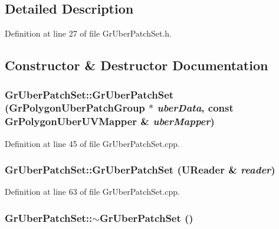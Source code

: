 \subsection{Detailed Description}


Definition at line 27 of file GrUberPatchSet.h.

\subsection{Constructor \& Destructor Documentation}
\hypertarget{class_gr_uber_patch_set_68d0f34222103250196fac2f52b8f4d6}{
\subsubsection[{GrUberPatchSet}]{\setlength{\rightskip}{0pt plus 5cm}GrUberPatchSet::GrUberPatchSet ({\bf GrPolygonUberPatchGroup} $\ast$ {\em uberData}, \/  const {\bf GrPolygonUberUVMapper} \& {\em uberMapper})}}
\label{class_gr_uber_patch_set_68d0f34222103250196fac2f52b8f4d6}




Definition at line 45 of file GrUberPatchSet.cpp.\hypertarget{class_gr_uber_patch_set_de170763792a014a4ec60906e5a559cc}{
\subsubsection[{GrUberPatchSet}]{\setlength{\rightskip}{0pt plus 5cm}GrUberPatchSet::GrUberPatchSet ({\bf UReader} \& {\em reader})}}
\label{class_gr_uber_patch_set_de170763792a014a4ec60906e5a559cc}




Definition at line 63 of file GrUberPatchSet.cpp.\hypertarget{class_gr_uber_patch_set_fcdf11f4dd58e87b0db2e0c990ea9eda}{
\subsubsection[{$\sim$GrUberPatchSet}]{\setlength{\rightskip}{0pt plus 5cm}GrUberPatchSet::$\sim$GrUberPatchSet ()}}
\label{class_gr_uber_patch_set_fcdf11f4dd58e87b0db2e0c990ea9eda}




